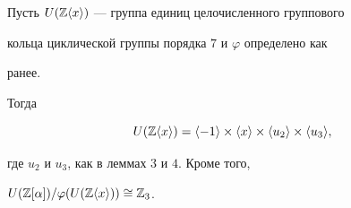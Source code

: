  


\begin{thm} 


Пусть $U(\Bbb Z\langle x\rangle)$ --- группа единиц целочисленного группового 


кольца циклической группы порядка $7$ и $\varphi$ определено как 


ранее.  


Тогда 


$$ 


U(\myzx)=\la-1\ra\times\la x\ra\times\la u_2\ra 


\times\la u_3\ra, 


$$ 


где $u_2$ и $u_3$, как в леммах $3$ и $4$. Кроме того, 


$U(\Bbb Z[\alpha])/\varphi(U(\Bbb Z\langle x\rangle))\cong\Bbb Z_3$. 


\end{thm} 


 


